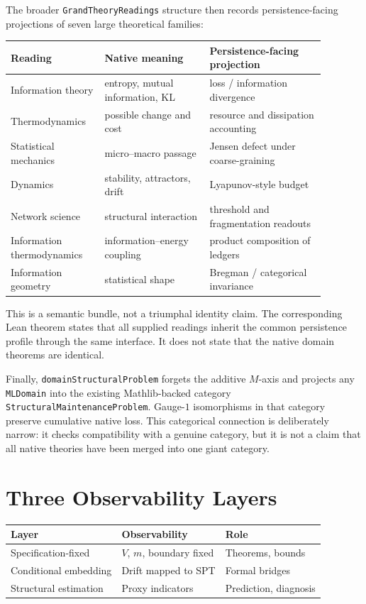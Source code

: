 \documentclass[11pt,a4paper]{article}
\begin{document}
The broader \texttt{GrandTheoryReadings} structure then records persistence-facing projections of seven large theoretical families:
\begin{center}
\begin{tabular}{p{0.25\linewidth}p{0.30\linewidth}p{0.33\linewidth}}
\toprule
Reading & Native meaning & Persistence-facing projection \\
\midrule
Information theory & entropy, mutual information, KL & loss / information divergence \\
Thermodynamics & possible change and cost & resource and dissipation accounting \\
Statistical mechanics & micro--macro passage & Jensen defect under coarse-graining \\
Dynamics & stability, attractors, drift & Lyapunov-style budget \\
Network science & structural interaction & threshold and fragmentation readouts \\
Information thermodynamics & information--energy coupling & product composition of ledgers \\
Information geometry & statistical shape & Bregman / categorical invariance \\
\bottomrule
\end{tabular}
\end{center}

This is a semantic bundle, not a triumphal identity claim. The corresponding Lean theorem states that all supplied readings inherit the common persistence profile through the same interface. It does not state that the native domain theorems are identical.

Finally, \texttt{domainStructuralProblem} forgets the additive $M$-axis and projects any \texttt{MLDomain} into the existing Mathlib-backed category \texttt{StructuralMaintenanceProblem}. Gauge-$1$ isomorphisms in that category preserve cumulative native loss. This categorical connection is deliberately narrow: it checks compatibility with a genuine category, but it is not a claim that all native theories have been merged into one giant category.

\section{Three Observability Layers}

\begin{center}
\begin{tabular}{lll}
\toprule
Layer & Observability & Role \\
\midrule
Specification-fixed & $V$, $m$, boundary fixed & Theorems, bounds \\
Conditional embedding & Drift mapped to SPT & Formal bridges \\
Structural estimation & Proxy indicators & Prediction, diagnosis \\
\bottomrule
\end{tabular}
\end{center}
\end{document}
